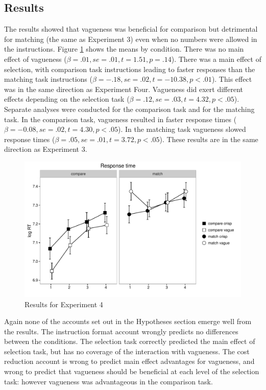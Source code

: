 \subsection{Results}
The results showed that vagueness was beneficial for comparison but detrimental for matching (the same as Experiment 3) even when no numbers were allowed in the instructions. Figure \ref{resultse4} shows the means by condition. There was no main effect of vagueness ($\beta=.01, se=.01, t=1.51, p=.14$). There was a main effect of selection, with comparison task instructions leading to faster responses than the matching task instructions ($\beta=-.18, se=.02, t=-10.38, p<.01$). This effect was in the same direction as Experiment Four. Vagueness did  exert different effects depending on the selection task ($\beta=.12, se=.03, t=4.32, p<.05$). Separate analyses were conducted for the comparison task and for the matching task. In the comparison task, vagueness resulted in faster response times ($\beta=-0.08, se=.02, t=4.30, p<.05$). In the matching task vagueness slowed response times ($\beta=.05, se=.01, t=3.72, p<.05$). These results are in the same direction as Experiment 3.

\begin{figure}[htbp]
\centering
\includegraphics[width=.75\textwidth]{images/response-time-two-panels-1-e4.pdf}
\caption{Results for Experiment 4}
\label{resultse4}
\end{figure}

Again none of the accounts set out in the Hypotheses section emerge well from the results. The instruction format account wrongly predicts no differences between the conditions. The selection task correctly predicted the main effect of selection task, but has no coverage of the interaction with vagueness. The cost reduction account is wrong to predict main effect advantages for vagueness, and wrong to predict that vagueness should be beneficial at each level of the selection task: however vagueness was advantageous in the comparison task.
